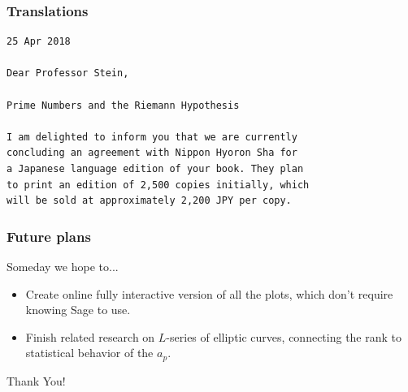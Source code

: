 \documentclass{beamer}
\begin{document}
\begin{frame}[fragile]
  \frametitle{Translations}
  \begin{verbatim}
25 Apr 2018

Dear Professor Stein,

Prime Numbers and the Riemann Hypothesis

I am delighted to inform you that we are currently
concluding an agreement with Nippon Hyoron Sha for
a Japanese language edition of your book. They plan
to print an edition of 2,500 copies initially, which
will be sold at approximately 2,200 JPY per copy.
  \end{verbatim}
\end{frame}


\begin{frame}
  \frametitle{Future plans}
  \begin{block}{Someday we hope to...}
    \begin{itemize}
      \item Create online fully interactive version of all the
            plots, which don't require knowing Sage to use.
      \item Finish related research on $L$-series of elliptic curves, connecting the rank to statistical
            behavior of the $a_p$.
    \end{itemize}
  \end{block}
  \vfill

  \begin{center}
Thank You!
\end{center}

\end{frame}
\end{document}
